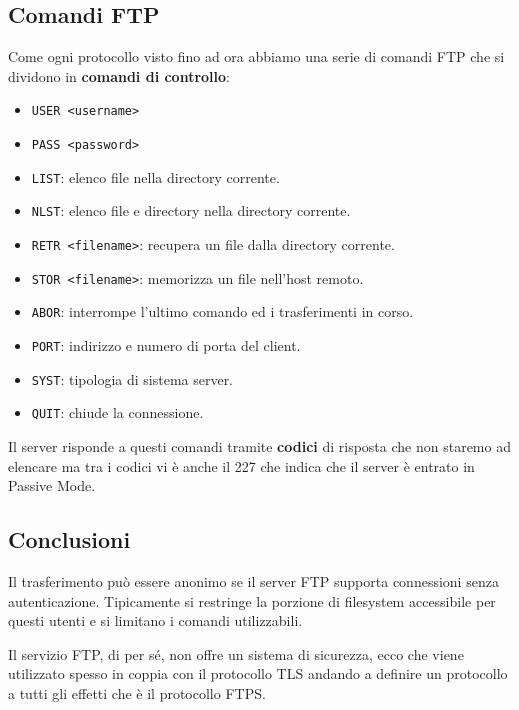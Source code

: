 \subsection{Comandi FTP}
Come ogni protocollo visto fino ad ora abbiamo una serie di comandi FTP che si dividono in
\textbf{comandi di controllo}:
\begin{itemize}
	\item \verb|USER <username>|
	\item \verb|PASS <password>|
	\item \verb|LIST|: elenco file nella directory corrente.
	\item \verb|NLST|: elenco file e directory nella directory corrente.
	\item \verb|RETR <filename>|: recupera un file dalla directory corrente.
	\item \verb|STOR <filename>|: memorizza un file nell'host remoto.
	\item \verb|ABOR|: interrompe l'ultimo comando ed i trasferimenti in corso.
	\item \verb|PORT|: indirizzo e numero di porta del client.
	\item \verb|SYST|: tipologia di sistema server.
	\item \verb|QUIT|: chiude la connessione.
\end{itemize}
Il server risponde a questi comandi tramite \textbf{codici} di risposta che non staremo ad
elencare ma tra i codici vi è anche il 227 che indica che il server è entrato in Passive Mode.

\subsection{Conclusioni}
Il trasferimento può essere anonimo se il server FTP supporta connessioni senza autenticazione.
Tipicamente si restringe la porzione di filesystem accessibile per questi utenti e si limitano
i comandi utilizzabili.

Il servizio FTP, di per sé, non offre un sistema di sicurezza, ecco che viene utilizzato spesso
in coppia con il protocollo TLS andando a definire un protocollo a tutti gli effetti che è il 
protocollo FTPS.
